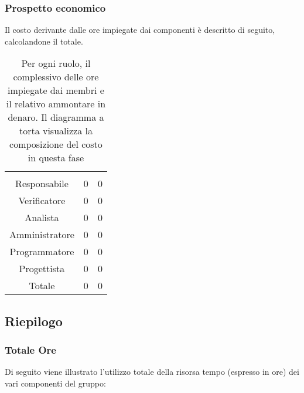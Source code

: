 \subsubsection{Prospetto economico}
Il costo derivante dalle ore impiegate dai componenti è descritto di seguito, calcolandone il totale.

\begin{table}[H]
	{\setlength{\parindent}{0cm}
		\begin{minipage}{.43\textwidth}
			\begin{tabular}{ccc}
				\rowcolorhead
				\headertitle{Ruolo} & \headertitle{Ore} & \headertitle{Costo(€)}\\
				Responsabile & 0 & 0\\
				Verificatore & 0 & 0\\
				Analista & 0 & 0\\
				Amministratore & 0 & 0\\
				Programmatore & 0 & 0\\
				Progettista & 0 & 0\\
				\hline
				Totale & 0& 0\\
			\end{tabular}
		\end{minipage}%
		\begin{minipage}{.57\textwidth}
	\end{minipage} }
	\caption{Per ogni ruolo, il complessivo delle ore impiegate dai membri e il relativo ammontare in denaro. Il diagramma a torta visualizza la composizione del costo in questa fase}
\end{table}




\subsection{Riepilogo}

\subsubsection{Totale Ore}
Di seguito viene illustrato l'utilizzo totale della risorsa tempo (espresso in ore) dei vari componenti del gruppo:

